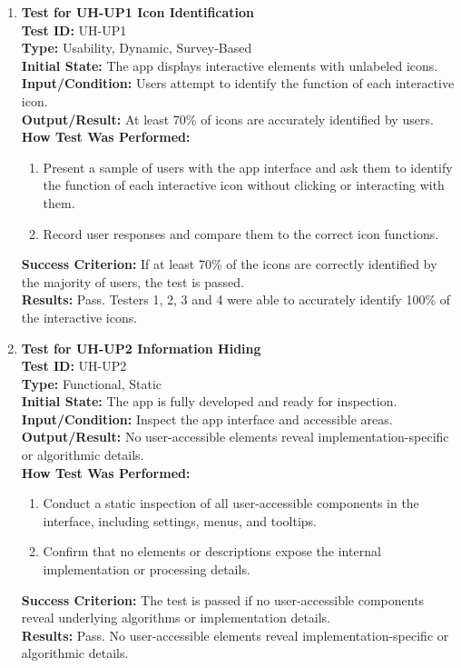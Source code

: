 \documentclass[12pt, titlepage]{article}
\begin{document}
\begin{enumerate}
    \item \textbf{Test for UH-UP1 Icon Identification} \\
      \newline
      \textbf{Test ID:} UH-UP1 \\
      \textbf{Type:} Usability, Dynamic, Survey-Based \\
      \textbf{Initial State:} The app displays interactive elements with unlabeled icons. \\
      \textbf{Input/Condition:} Users attempt to identify the function of each interactive icon. \\
      \textbf{Output/Result:} At least 70\% of icons are accurately identified by users. \\
      \textbf{How Test Was Performed:}
      \begin{enumerate}
          \item Present a sample of users with the app interface and ask them to identify the function of each interactive icon 
          without clicking or interacting with them.
          \item Record user responses and compare them to the correct icon functions.
      \end{enumerate}
      \textbf{Success Criterion:} If at least 70\% of the icons are correctly identified by the majority of users, the test is passed.\\
      \textbf{Results:} Pass. Testers 1, 2, 3 and 4 were able to accurately identify 100\% of the interactive icons.\\

    \item \textbf{Test for UH-UP2 Information Hiding} \\
      \newline
      \textbf{Test ID:} UH-UP2 \\
      \textbf{Type:} Functional, Static \\
      \textbf{Initial State:} The app is fully developed and ready for inspection. \\
      \textbf{Input/Condition:} Inspect the app interface and accessible areas. \\
      \textbf{Output/Result:} No user-accessible elements reveal implementation-specific or algorithmic details. \\
      \textbf{How Test Was Performed:}
      \begin{enumerate}
          \item Conduct a static inspection of all user-accessible components in the interface, including settings, menus, and tooltips.
          \item Confirm that no elements or descriptions expose the internal implementation or processing details.
      \end{enumerate}
      \textbf{Success Criterion:} The test is passed if no user-accessible components reveal underlying algorithms or implementation 
      details.\\
      \textbf{Results:} Pass. No user-accessible elements reveal implementation-specific or algorithmic details.\\


\end{enumerate}
\end{document}
